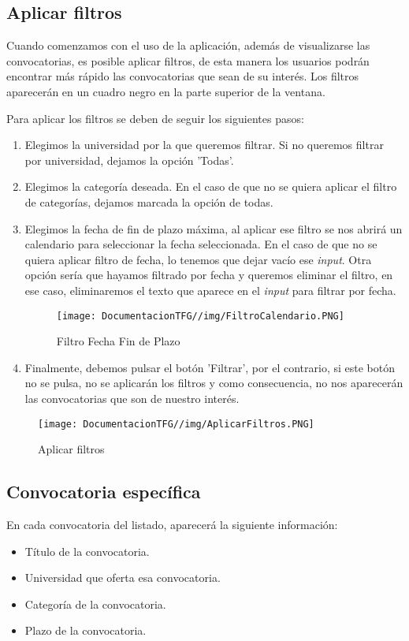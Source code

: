\subsection{Aplicar filtros}
Cuando comenzamos con el uso de la aplicación, además de visualizarse las convocatorias, es posible aplicar filtros, de esta manera los usuarios podrán encontrar más rápido las convocatorias que sean de su interés. Los filtros aparecerán en un cuadro negro en la parte superior de la ventana.

Para aplicar los filtros se deben de seguir los siguientes pasos:
\begin{enumerate}
   \item Elegimos la universidad por la que queremos filtrar. Si no queremos filtrar por universidad, dejamos la opción 'Todas'. 
   \item Elegimos la categoría deseada. En el caso de que no se quiera aplicar el filtro de categorías, dejamos marcada la opción de todas.
   \item Elegimos la fecha de fin de plazo máxima, al aplicar ese filtro se nos abrirá un calendario para seleccionar la fecha seleccionada. En el caso de que no se quiera aplicar filtro de fecha, lo tenemos que dejar vacío ese \textit{input}. Otra opción sería que hayamos filtrado por fecha y queremos eliminar el filtro, en ese caso, eliminaremos el texto que aparece en el \textit{input} para filtrar por fecha.
   \begin{figure}[H]
    \centering
    \texttt{[image: DocumentacionTFG//img/FiltroCalendario.PNG]}
    \caption{Filtro Fecha Fin de Plazo}
    \label{fig:filtro-calendario}
\end{figure}
   \item Finalmente, debemos pulsar el botón 'Filtrar', por el contrario, si este botón no se pulsa, no se aplicarán los filtros y como consecuencia, no nos aparecerán las convocatorias que son de nuestro interés.
\end{enumerate}

\begin{figure}[H]
    \centering
    \texttt{[image: DocumentacionTFG//img/AplicarFiltros.PNG]}
    \caption{Aplicar filtros}
    \label{fig:aplicar-filtros}
\end{figure}

\subsection{Convocatoria específica}\label{convocatoria-especifica}
En cada convocatoria del listado, aparecerá la siguiente información:
\begin{itemize}
    \item Título de la convocatoria.
    \item Universidad que oferta esa convocatoria.
    \item Categoría de la convocatoria.
    \item Plazo de la convocatoria.
\end{itemize}

